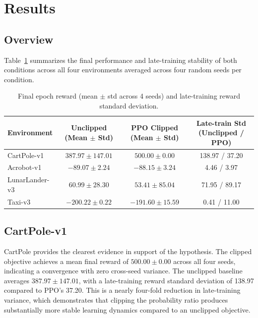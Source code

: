 \documentclass{article}
\begin{document}
\section{Results}

\subsection{Overview}

Table~\ref{tab:results} summarizes the final performance and late-training stability of both conditions across all four environments averaged across four random seeds per condition.

\begin{table}[h]
\caption{Final epoch reward (mean $\pm$ std across 4 seeds) and late-training reward standard deviation.}
\label{tab:results}
\begin{center}
\begin{tabular}{lccc}
\toprule
\textbf{Environment} & \textbf{Unclipped (Mean $\pm$ Std)} &
\textbf{PPO Clipped (Mean $\pm$ Std)} &
\textbf{Late-train Std (Unclipped / PPO)} \\
\midrule
CartPole-v1    & $387.97 \pm 147.01$ & $500.00 \pm 0.00$   & 138.97 / 37.20 \\
Acrobot-v1     & $-89.07 \pm 2.24$   & $-88.15 \pm 3.24$   & 4.46 / 3.97    \\
LunarLander-v3 & $60.99 \pm 28.30$   & $53.41 \pm 85.04$   & 71.95 / 89.17  \\
Taxi-v3        & $-200.22 \pm 0.22$  & $-191.60 \pm 15.59$ & 0.41 / 11.00   \\
\bottomrule
\end{tabular}
\end{center}
\end{table}

\subsection{CartPole-v1}

CartPole provides the clearest evidence in support of the hypothesis. The clipped objective achieves a mean final reward of $500.00 \pm 0.00$ across all four seeds, indicating a convergence with zero cross-seed variance. The unclipped baseline averages $387.97 \pm 147.01$, with a late-training reward standard deviation of 138.97 compared to PPO's 37.20. This is a nearly four-fold reduction in late-training variance, which demonstrates that clipping the probability ratio produces substantially more stable learning dynamics compared to an unclipped objective.
\end{document}
